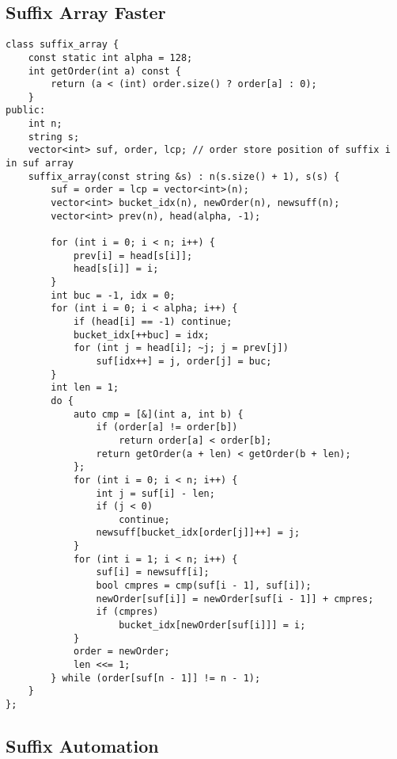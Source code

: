 {\subsection{Suffix Array Faster}

\begin{lstlisting}[style=cpp]
class suffix_array {  
    const static int alpha = 128;  
    int getOrder(int a) const {  
        return (a < (int) order.size() ? order[a] : 0);  
    }  
public:  
    int n;  
    string s;  
    vector<int> suf, order, lcp; // order store position of suffix i in suf array  
    suffix_array(const string &s) : n(s.size() + 1), s(s) {  
        suf = order = lcp = vector<int>(n);  
        vector<int> bucket_idx(n), newOrder(n), newsuff(n);  
        vector<int> prev(n), head(alpha, -1);  
          
        for (int i = 0; i < n; i++) {  
            prev[i] = head[s[i]];  
            head[s[i]] = i;  
        }  
        int buc = -1, idx = 0;  
        for (int i = 0; i < alpha; i++) {  
            if (head[i] == -1) continue;  
            bucket_idx[++buc] = idx;  
            for (int j = head[i]; ~j; j = prev[j])  
                suf[idx++] = j, order[j] = buc;  
        }  
        int len = 1;  
        do {  
            auto cmp = [&](int a, int b) {  
                if (order[a] != order[b])  
                    return order[a] < order[b];  
                return getOrder(a + len) < getOrder(b + len);  
            };  
            for (int i = 0; i < n; i++) {  
                int j = suf[i] - len;  
                if (j < 0)  
                    continue;  
                newsuff[bucket_idx[order[j]]++] = j;  
            }  
            for (int i = 1; i < n; i++) {  
                suf[i] = newsuff[i];  
                bool cmpres = cmp(suf[i - 1], suf[i]);  
                newOrder[suf[i]] = newOrder[suf[i - 1]] + cmpres;  
                if (cmpres)  
                    bucket_idx[newOrder[suf[i]]] = i;  
            }  
            order = newOrder;  
            len <<= 1;  
        } while (order[suf[n - 1]] != n - 1);  
    }  
};
\end{lstlisting}

\subsection{Suffix Automation}

}
